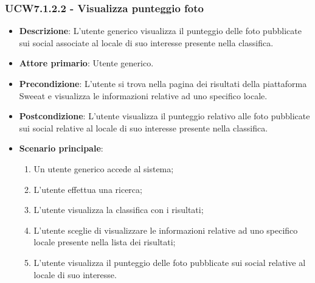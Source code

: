 \subsubsection{UCW7.1.2.2 - Visualizza punteggio foto}
\begin{itemize}
	\item \textbf{Descrizione}: L'utente generico visualizza il punteggio delle foto pubblicate sui social associate al locale di suo interesse presente nella classifica.
    \item \textbf{Attore primario}: Utente generico.
    \item \textbf{Precondizione}: L’utente si trova nella pagina dei risultati della piattaforma Sweeat e visualizza le informazioni relative ad uno specifico locale.
    \item \textbf{Postcondizione}: L’utente visualizza il punteggio relativo alle foto pubblicate sui social relative al locale di suo interesse presente nella classifica.
    \item \textbf{Scenario principale}: 
    \begin{enumerate}
        \item Un utente generico accede al sistema;
        \item L’utente effettua una ricerca;
        \item L'utente visualizza la classifica con i risultati;
        \item L'utente sceglie di visualizzare le informazioni relative ad uno specifico locale presente nella lista dei risultati;
        \item L'utente visualizza il punteggio delle foto pubblicate sui social relative al locale di suo interesse.
    \end{enumerate}
\end{itemize}

